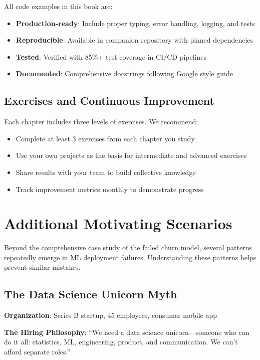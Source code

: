 All code examples in this book are:
\begin{itemize}
    \item \textbf{Production-ready}: Include proper typing, error handling, logging, and tests
    \item \textbf{Reproducible}: Available in companion repository with pinned dependencies
    \item \textbf{Tested}: Verified with 85\%+ test coverage in CI/CD pipelines
    \item \textbf{Documented}: Comprehensive docstrings following Google style guide
\end{itemize}

\subsection{Exercises and Continuous Improvement}

Each chapter includes three levels of exercises. We recommend:
\begin{itemize}
    \item Complete at least 3 exercises from each chapter you study
    \item Use your own projects as the basis for intermediate and advanced exercises
    \item Share results with your team to build collective knowledge
    \item Track improvement metrics monthly to demonstrate progress
\end{itemize}

\section{Additional Motivating Scenarios}

Beyond the comprehensive case study of the failed churn model, several patterns repeatedly emerge in ML deployment failures. Understanding these patterns helps prevent similar mistakes.

\subsection{The Data Science Unicorn Myth}

\textbf{Organization}: Series B startup, 45 employees, consumer mobile app

\textbf{The Hiring Philosophy}: ``We need a data science unicorn---someone who can do it all: statistics, ML, engineering, product, and communication. We can't afford separate roles.''

